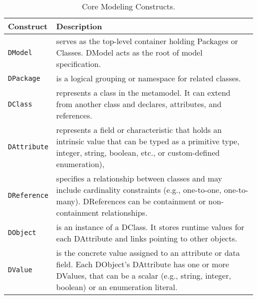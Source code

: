 \begin{table}[h]
    \centering
        \caption{Core Modeling Constructs.}
    \label{tab:core-modeling}
    \begin{tabular}{|l|p{9.5cm}|}
    \hline
        \textbf{Construct} & \textbf{Description} \\ \hline
         \texttt{DModel} & serves as the top-level container holding Packages or Classes. DModel acts as the root of model specification.
  \\ \hline
        \texttt{DPackage} & is a logical grouping or namespace for related classes. \\ \hline
        \texttt{DClass} & represents a class in the metamodel. It can extend from another class and declares, attributes, and references. \\ \hline
        \texttt{DAttribute} & represents a field or characteristic that holds an intrinsic value that can be typed as a primitive type, \ie{} integer, string, boolean, etc., or custom-defined enumeration),\\ \hline
        \texttt{DReference} & specifies a relationship between classes and may include cardinality constraints (e.g., one-to-one, one-to-many). DReferences can be containment or non-containment relationships. \\ \hline
        \texttt{DObject} & is an instance of a DClass. It stores runtime values for each DAttribute and links pointing to other objects.\\ \hline
        \texttt{DValue} & is the concrete value assigned to an attribute or data field. Each DObject’s DAttribute has one or more DValues, that can be a scalar (e.g., string, integer, boolean) or an enumeration literal. \\ \hline
    \end{tabular}
\end{table}


